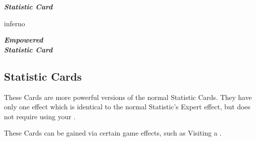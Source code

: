 \begin{paracol}{2}
  \begin{expansion}[title=\phantom{\textbf{\tiny{foo}}}, overlay={}]{}
    \footnotesize
    \begin{center}
      \begin{scriptsize}
      \end{scriptsize}
      \textbf{\textit{\textcolor{darkcandyapplered}{Statistic Card\\\phantom{Blah}}}}
    \end{center}
  \end{expansion}
  \switchcolumn
  \begin{expansion}{inferno}
    \hspace*{-2.3mm}
    \begin{minipage}[t]{0.3\linewidth}
      \footnotesize
      \vspace*{0mm}
      \begin{center}
        \begin{scriptsize}
        \end{scriptsize}
        \textbf{\textit{\textcolor{darkcandyapplered}{Empowered\\Statistic Card}}}
      \end{center}
    \end{minipage}
    \hfill
    \begin{minipage}[t]{0.65\linewidth}
      \vspace*{0mm}
      \subsection*{ Statistic Cards}
      These Cards are more powerful versions of the normal Statistic Cards.
      They have only one effect which is identical to the normal Statistic's Expert effect, but does not require using your .\par

      \medskip
      These Cards can be gained via certain game effects, such as Visiting a .
    \end{minipage}
  \end{expansion}
\end{paracol}
